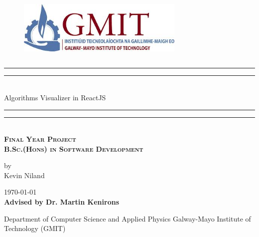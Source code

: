\documentclass{book}
\newcommand*{\customTitle}{\begingroup 
\centering 
\vspace*{\baselineskip} 

\rule{\textwidth}{1.6pt}\vspace*{-\baselineskip}\vspace*{2pt} 
\rule{\textwidth}{0.4pt}\\[\baselineskip]

{\Large Algorithms Visualizer in ReactJS}\\[0.2\baselineskip] 

\rule{\textwidth}{0.4pt}\vspace*{-\baselineskip}\vspace{3.2pt} 
\rule{\textwidth}{1.6pt}\\[\baselineskip] 
\scshape 
\Large \textbf{Final Year Project}\\
\textbf{B.Sc.(Hons) in Software Development}\par
\normalsize
\vspace*{2\baselineskip} 

{by \\ Kevin Niland \par} 

\vspace*{2\baselineskip}
\vfill 
{\scshape \today} \\[0.3\baselineskip]

{\textbf{Advised by Dr. Martin Kenirons}}\par 
{Department of Computer Science and Applied Physics Galway-Mayo Institute of Technology (GMIT)}\par

\endgroup}
\begin{document}
 
\begin{figure}
\begin{center}
\includegraphics[width=8cm,height=3.3cm,keepaspectratio]{images/gmit-logo} 
\end{center}
\end{figure}
\customTitle
\tableofcontents
{} 










\end{document}
